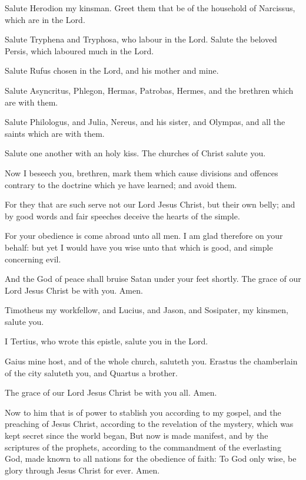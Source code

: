 \Verse Salute Herodion my kinsman. Greet them that be of the household of Narcissus, which are in the Lord.

\Verse Salute Tryphena and Tryphosa, who labour in the Lord. Salute the beloved Persis, which laboured much in the Lord.

\Verse Salute Rufus chosen in the Lord, and his mother and mine.

\Verse Salute Asyncritus, Phlegon, Hermas, Patrobas, Hermes, and the brethren which are with them.

\Verse Salute Philologus, and Julia, Nereus, and his sister, and Olympas, and all the saints which are with them.

\Verse Salute one another with an holy kiss. The churches of Christ salute you.

\Verse Now I beseech you, brethren, mark them which cause divisions and offences contrary to the doctrine which ye have learned; and avoid them.

\Verse For they that are such serve not our Lord Jesus Christ, but their own belly; and by good words and fair speeches deceive the hearts of the simple.

\Verse For your obedience is come abroad unto all men. I am glad therefore on your behalf: but yet I would have you wise unto that which is good, and simple concerning evil.

\Verse And the God of peace shall bruise Satan under your feet shortly.  The grace of our Lord Jesus Christ be with you. Amen.

\Verse Timotheus my workfellow, and Lucius, and Jason, and Sosipater, my kinsmen, salute you.

\Verse I Tertius, who wrote this epistle, salute you in the Lord.

\Verse Gaius mine host, and of the whole church, saluteth you. Erastus the chamberlain of the city saluteth you, and Quartus a brother.

\Verse The grace of our Lord Jesus Christ be with you all. Amen.

\Verse Now to him that is of power to stablish you according to my gospel, and the preaching of Jesus Christ, according to the revelation of the mystery, which was kept secret since the world began, \Verse But now is made manifest, and by the scriptures of the prophets, according to the commandment of the everlasting God, made known to all nations for the obedience of faith: \Verse To God only wise, be glory through Jesus Christ for ever. Amen.

